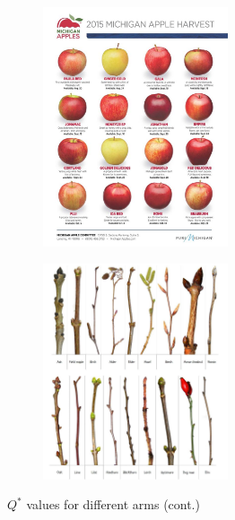 \documentclass{article}
\begin{document}
\begin{figure}[htb]\ContinuedFloat
    \centering
    \begin{subfigure}[b]{\textwidth}
        \includegraphics[width=0.6\textwidth]{images/apple_varieties4.jpg}
        \label{fig:arm3}
    \end{subfigure}
%
    \begin{subfigure}[b]{\textwidth}
        \includegraphics[width=0.6\textwidth]{images/Winter_twigs.jpg}
        \label{fig:arm4}
    \end{subfigure}
    \caption{$Q^{*}$ values for different arms (cont.)}
    \label{fig:arms}
\end{figure}
    
\end{document}
